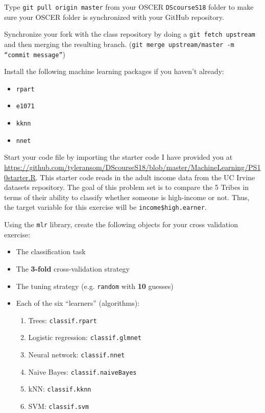 \documentclass[12pt,english]{exam}
\begin{document}
\begin{questions}
\question Type \texttt{git pull origin master} from your OSCER \texttt{DScourseS18} folder to make sure your OSCER folder is synchronized with your GitHub repository. 

\question Synchronize your fork with the class repository by doing a \texttt{git fetch upstream} and then merging the resulting branch. (\texttt{git merge upstream/master -m ``commit message''})

\question Install the following machine learning packages if you haven't already:
\begin{itemize}
    \item \texttt{rpart}
    \item \texttt{e1071}
    \item \texttt{kknn}
    \item \texttt{nnet}
\end{itemize}

\question Start your code file by importing the starter code I have provided you at \url{https://github.com/tyleransom/DScourseS18/blob/master/MachineLearning/PS10starter.R}. This starter code reads in the adult income data from the UC Irvine datasets repository. The goal of this problem set is to compare the 5 Tribes in terms of their ability to classify whether someone is high-income or not. Thus, the target variable for this exercise will be \texttt{income\$high.earner}. 

\question Using the \texttt{mlr} library, create the following objects for your cross validation exercise:
\begin{itemize}
\item The classification task
\item The \textbf{3-fold} cross-validation strategy
\item The tuning strategy (e.g. \texttt{random} with \textbf{10} guesses)
\item Each of the six ``learners'' (algorithms):
    \begin{enumerate}
    \item Trees: \texttt{classif.rpart}
    \item Logistic regression: \texttt{classif.glmnet}    
    \item Neural network: \texttt{classif.nnet}      
    \item Naive Bayes: \texttt{classif.naiveBayes}
    \item kNN: \texttt{classif.kknn}       
    \item SVM: \texttt{classif.svm}       
    \end{enumerate}


\end{itemize}
\end{questions}
\end{document}
